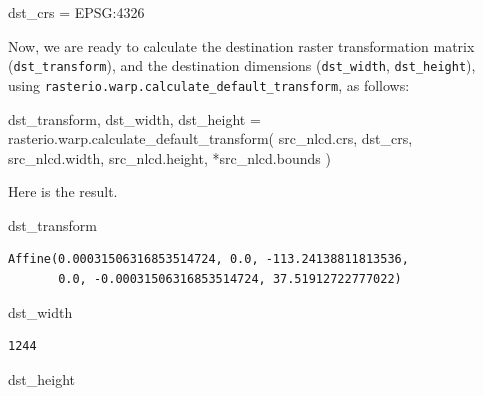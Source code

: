 \documentclass[
  letterpaper,
]{krantz}
\newenvironment{Shaded}{\begin{snugshade}}{\end{snugshade}}
\newcommand{\NormalTok}[1]{\textcolor[rgb]{0.00,0.23,0.31}{#1}}
\newcommand{\OperatorTok}[1]{\textcolor[rgb]{0.37,0.37,0.37}{#1}}
\newcommand{\StringTok}[1]{\textcolor[rgb]{0.13,0.47,0.30}{#1}}
\begin{document}
\begin{Shaded}
\begin{Highlighting}[]
\NormalTok{dst\_crs }\OperatorTok{=} \StringTok{\textquotesingle{}EPSG:4326\textquotesingle{}}
\end{Highlighting}
\end{Shaded}

Now, we are ready to calculate the destination raster transformation
matrix (\texttt{dst\_transform}), and the destination dimensions
(\texttt{dst\_width}, \texttt{dst\_height}), using
\texttt{rasterio.warp.calculate\_default\_transform}, as follows:

\begin{Shaded}
\begin{Highlighting}[]
\NormalTok{dst\_transform, dst\_width, dst\_height }\OperatorTok{=}\NormalTok{ rasterio.warp.calculate\_default\_transform(}
\NormalTok{    src\_nlcd.crs,}
\NormalTok{    dst\_crs,}
\NormalTok{    src\_nlcd.width,}
\NormalTok{    src\_nlcd.height,}
    \OperatorTok{*}\NormalTok{src\_nlcd.bounds}
\NormalTok{)}
\end{Highlighting}
\end{Shaded}

Here is the result.

\begin{Shaded}
\begin{Highlighting}[]
\NormalTok{dst\_transform}
\end{Highlighting}
\end{Shaded}

\begin{verbatim}
Affine(0.00031506316853514724, 0.0, -113.24138811813536,
       0.0, -0.00031506316853514724, 37.51912722777022)
\end{verbatim}

\begin{Shaded}
\begin{Highlighting}[]
\NormalTok{dst\_width}
\end{Highlighting}
\end{Shaded}

\begin{verbatim}
1244
\end{verbatim}

\begin{Shaded}
\begin{Highlighting}[]
\NormalTok{dst\_height}
\end{Highlighting}
\end{Shaded}
\end{document}
